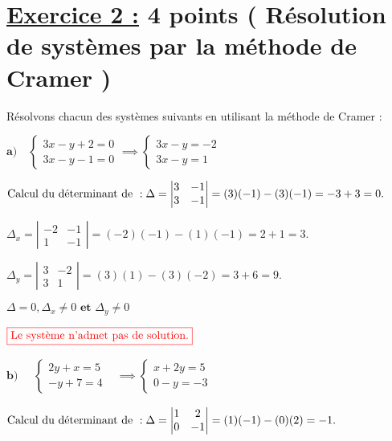 \documentclass[12pt,a4paper]{article}
\begin{document}
\section*{\underline{Exercice 2 :} 4 points ( Résolution de systèmes par la méthode de Cramer )}
Résolvons chacun des systèmes suivants en utilisant la méthode de Cramer :

\(\textbf{a)}\quad
\begin{cases}
3x - y + 2 = 0 \\
3x - y - 1 = 0
\end{cases}\implies
\begin{cases}
3x - y = -2 \\
3x - y = 1
\end{cases}
\)


\(
\text{Calcul du déterminant de } : \\
\Delta = \left| \begin{matrix} 3 & -1 \\ 3 & -1 \end{matrix} \right| = (3)(-1) - (3)(-1) = -3 + 3 = 0.
\)

\(
\Delta_{x} = \left| \begin{matrix} -2 & -1 \\ 1 & -1 \end{matrix} \right| = (-2)(-1) - (1)(-1) = 2 + 1 = 3.
\)

\(
\Delta_{y} = \left| \begin{matrix} 3 & -2 \\ 3 & 1 \end{matrix} \right| = (3)(1) - (3)(-2) = 3 + 6 = 9.
\)

\(
\Delta=0, \Delta_{x}\neq 0 \textbf{ et } \Delta_{y}\neq 0
\)

\(
\textcolor{red}{\boxed{\text{Le système n'admet pas de solution.}}}\\
\)

\(\textbf{b)} \quad
\begin{aligned}
\begin{cases}
2y + x = 5 \\
-y + 7 = 4
\end{cases}&\implies
\begin{cases}
x+2y = 5 \\
0-y  = -3
\end{cases}
\end{aligned}
\)


\(
\text{Calcul du déterminant de } : \\
\Delta = \left| \begin{matrix} 1 & 2 \\ 0 & -1 \end{matrix} \right| = (1)(-1) - (0)(2) = -1.
\)
\end{document}
